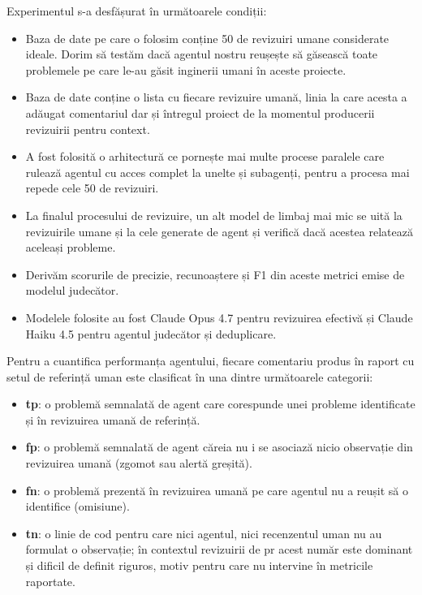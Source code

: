 \documentclass[12pt, a4paper, oneside, romanian]{teza-upb}
\begin{document}
    Experimentul s-a desfășurat în următoarele condiții:
    \begin{itemize}
      \item Baza de date pe care o folosim conține 50 de revizuiri umane considerate ideale. Dorim să testăm dacă agentul nostru reușește să găsească toate problemele pe care le-au găsit inginerii umani în aceste proiecte.
      \item Baza de date conține o lista cu fiecare revizuire umană, linia la care acesta a adăugat comentariul dar și întregul proiect de la momentul producerii revizuirii pentru context.
      \item A fost folosită o arhitectură ce pornește mai multe procese paralele care rulează agentul cu acces complet la unelte și subagenți, pentru a procesa mai repede cele 50 de revizuiri.
      \item La finalul procesului de revizuire, un alt model de limbaj mai mic se uită la revizuirile umane și la cele generate de agent și verifică dacă acestea relatează aceleași probleme.
      \item Derivăm scorurile de precizie, recunoaștere și F1 din aceste metrici emise de modelul judecător.
      \item Modelele folosite au fost Claude Opus 4.7 pentru revizuirea efectivă și Claude Haiku 4.5 pentru agentul judecător și deduplicare.
    \end{itemize}

    Pentru a cuantifica performanța agentului, fiecare comentariu produs în raport cu setul de referință uman este clasificat în una dintre următoarele categorii:
    \begin{itemize}
      \item \textbf{\ac{tp}}: o problemă semnalată de agent care corespunde unei probleme identificate și în revizuirea umană de referință.
      \item \textbf{\ac{fp}}: o problemă semnalată de agent căreia nu i se asociază nicio observație din revizuirea umană (zgomot sau alertă greșită).
      \item \textbf{\ac{fn}}: o problemă prezentă în revizuirea umană pe care agentul nu a reușit să o identifice (omisiune).
      \item \textbf{\ac{tn}}: o linie de cod pentru care nici agentul, nici recenzentul uman nu au formulat o observație; în contextul revizuirii de \ac{pr} acest număr este dominant și dificil de definit riguros, motiv pentru care nu intervine în metricile raportate.
    \end{itemize}
\end{document}
